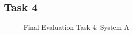 \subsection*{Task 4}
\begin{figure}[!h]
  \centering
  \begin{minipage}[b]{0.47\textwidth}
    \caption{Final Evaluation Task 4: System A}
  \end{minipage}
\end{figure}

\newpage
